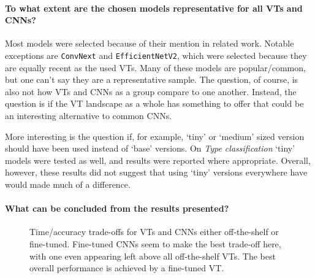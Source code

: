 
\paragraph{To what extent are the chosen models representative for all VTs and CNNs?}
Most models were selected because of their mention in related work. Notable exceptions are \texttt{ConvNext} and \texttt{EfficientNetV2}, which were selected because they are equally recent as the used VTs. Many of these models are popular/common, but one can't say they are a representative sample. The question, of course, is also not how VTs and CNNs as a group compare to one another. Instead, the question is if the VT landscape as a whole has something to offer that could be an interesting alternative to common CNNs.

More interesting is the question if, for example, `tiny' or `medium' sized version should have been used instead of `base' versions. On \textit{Type classification} `tiny' models were tested as well, and results were reported where appropriate. Overall, however, these results did not suggest that using `tiny' versions everywhere have would made much of a difference.

\paragraph{What can be concluded from the results presented?}

\begin{figure}[tbh]
    \centering
    \def\svgwidth{7.7cm}
    
    \caption{Time/accuracy trade-offs for VTs and CNNs either off-the-shelf or fine-tuned. Fine-tuned CNNs seem to make the best trade-off here, with one even appearing left above all off-the-shelf VTs. The best overall performance is achieved by a fine-tuned VT.}
    \label{results:img:ots_vs_ft_type}
\end{figure}

